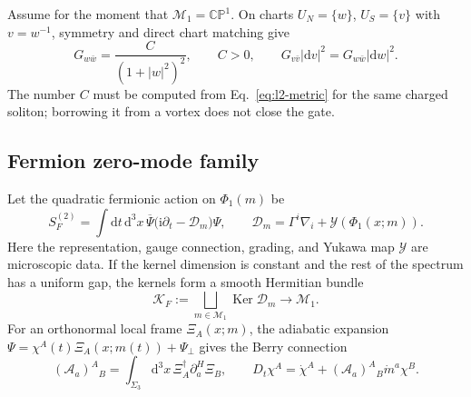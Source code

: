 \documentclass[11pt]{article}
\theoremstyle{definition}
\theoremstyle{remark}
\newcommand{\ii}{\mathrm i}
\newcommand{\dd}{\mathrm d}
\newcommand{\CP}{\mathbb {CP}}
\newcommand{\cK}{\mathcal K}
\newcommand{\cM}{\mathcal M}
\newcommand{\Ker}{\operatorname{Ker}}
\begin{document}
Assume for the moment that \(\cM_1=\CP^1\).  On charts
\(U_N=\{w\}\), \(U_S=\{v\}\) with \(v=w^{-1}\), symmetry and direct chart
matching give
\begin{equation}
 G_{w\bar w}=\frac{C}{(1+|w|^2)^2},
 \qquad C>0,
 \qquad
 G_{v\bar v}|\dd v|^2=G_{w\bar w}|\dd w|^2.
 \label{eq:fs-metric}
\end{equation}
The number \(C\) must be computed from Eq.~\eqref{eq:l2-metric} for the same
charged soliton; borrowing it from a vortex does not close the gate.

\subsection{Fermion zero-mode family}

Let the quadratic fermionic action on \(\Phi_1(m)\) be
\begin{equation}
 S_F^{(2)}
 =\int\dd t\,\dd^3x\,
 \overline\Psi\bigl(\ii\partial_t-\mathscr D_m\bigr)\Psi,
 \qquad
 \mathscr D_m=\Gamma^i\nabla_i+\mathscr Y(\Phi_1(x;m)).
 \label{eq:fermion-family}
\end{equation}
Here the representation, gauge connection, grading, and Yukawa map
\(\mathscr Y\) are microscopic data.  If the kernel dimension is constant
and the rest of the spectrum has a uniform gap, the kernels form a smooth
Hermitian bundle
\begin{equation}
 \cK_F:=\bigsqcup_{m\in\cM_1}\Ker\mathscr D_m
 \longrightarrow\cM_1.
 \label{eq:kernel-bundle}
\end{equation}
For an orthonormal local frame \(\Xi_A(x;m)\), the adiabatic expansion
\(\Psi=\chi^A(t)\Xi_A(x;m(t))+\Psi_\perp\) gives the Berry connection
\begin{equation}
 (\mathcal A_a)^A{}_B
 =\int_{\Sigma_3}\dd^3x\,
 \Xi_A^\dagger\partial_a^H\Xi_B,
 \qquad
 D_t\chi^A=\dot\chi^A+(\mathcal A_a)^A{}_B\dot m^a\chi^B.
 \label{eq:berry-connection}
\end{equation}
\end{document}
